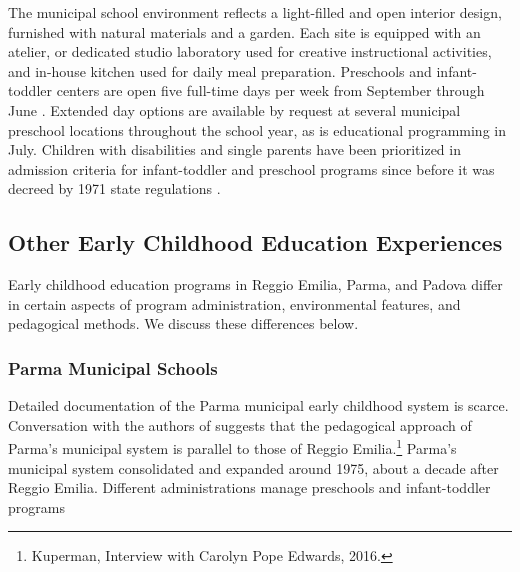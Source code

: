 The municipal school environment reflects a light-filled and open interior design, furnished with natural materials and a garden. Each site is equipped with an atelier, or dedicated studio laboratory used for creative instructional activities, and in-house kitchen used for daily meal preparation. Preschools and infant-toddler centers are open five full-time days per week from September through June \citep{Giudici-Nicolosi_2014_Reggio-Approach}. Extended day options are available by request at several municipal preschool locations throughout the school year, as is educational programming in July. Children with disabilities and single parents have been prioritized in admission criteria for infant-toddler and preschool programs since before it was decreed by 1971 state regulations \citep{Edwards-etal-eds_1998_Hundred-Languages}.


\subsection{Other Early Childhood Education Experiences}

Early childhood education programs in Reggio Emilia, Parma, and Padova differ in certain aspects of program administration, environmental features, and pedagogical methods. We discuss these differences below. 


\subsubsection{Parma Municipal Schools}

Detailed documentation of the Parma municipal early childhood system is scarce. Conversation with the authors of \citet{Edwards-etal-eds_1998_Hundred-Languages} suggests that the pedagogical approach of Parma's municipal system is parallel to those of Reggio Emilia.\footnote{Kuperman, Interview with Carolyn Pope Edwards, 2016.} Parma's municipal system consolidated and expanded around 1975, about a decade after Reggio Emilia. Different administrations manage preschools and infant-toddler programs

